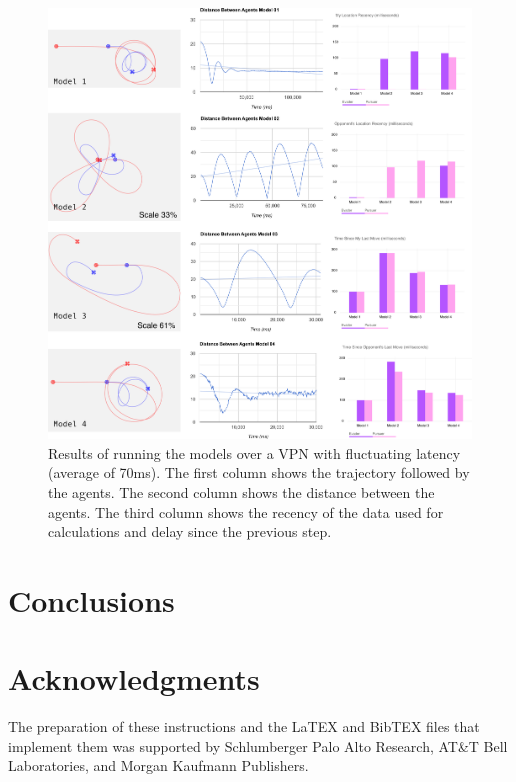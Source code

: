 \documentclass{article}
\begin{document}
\begin{figure}
	\centering
	\includegraphics[width=17.0cm]{charts-vpn}
	\caption{Results of running the models over a VPN with fluctuating latency (average of 70ms). The first column shows the trajectory followed by the agents. The second column shows the distance between the agents. The third column shows the recency of the data used for calculations and delay since the previous step.}\label{fig:charts-vpn}
\end{figure}



\section{Conclusions}

\section*{Acknowledgments}
The preparation of these instructions and the LaTEX and BibTEX files that implement them was supported by Schlumberger Palo Alto Research, AT\&T Bell Laboratories, and Morgan Kaufmann Publishers.


%
%


\end{document}
